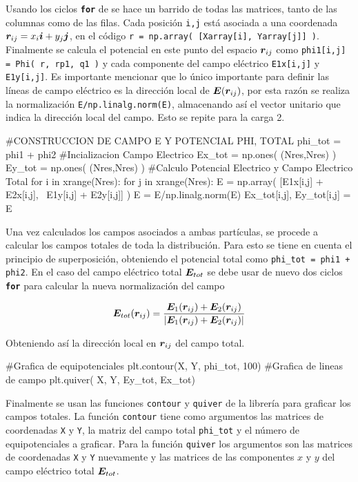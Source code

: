 Usando los ciclos \textbf{\texttt{for}} de \python se hace un barrido de 
todas las matrices, tanto de las columnas como de las filas. Cada posición 
\texttt{i,j} está asociada a una coordenada $\boldsymbol{ r }_{ij} = x_i\boldsymbol{ i } + 
y_j\boldsymbol{ j }$, en el código \texttt{r = np.array( [Xarray[i], Yarray[j]] )}.
Finalmente se calcula el potencial en este punto del espacio $\boldsymbol{ r }_{ij}$
como \texttt{phi1[i,j] = Phi( r, rp1, q1 )} y cada componente del campo 
eléctrico \texttt{E1x[i,j]} y \texttt{E1y[i,j]}. Es importante mencionar
que lo único importante para definir las líneas de campo eléctrico es la
dirección local de $\boldsymbol{ E }(\boldsymbol{ r }_{ij})$, por esta razón se realiza la
normalización \texttt{E/np.linalg.norm(E)}, almacenando así el vector 
unitario que indica la dirección local del campo. Esto se repite para la
carga 2.


\begin{listing}[style=python, numbers = none]
#CONSTRUCCION DE CAMPO E Y POTENCIAL PHI, TOTAL
phi_tot = phi1 + phi2
#Incializacion Campo Electrico
Ex_tot = np.ones( (Nres,Nres) )
Ey_tot = np.ones( (Nres,Nres) )
#Calculo Potencial Electrico y Campo Electrico Total
for i in xrange(Nres):
    for j in xrange(Nres):
	E = np.array( [E1x[i,j] + E2x[i,j], \
	E1y[i,j] + E2y[i,j]] )
	E = E/np.linalg.norm(E)
	Ex_tot[i,j], Ey_tot[i,j] = E 
\end{listing}
Una vez calculados los campos asociados a ambas partículas, se procede a 
calcular los campos totales de toda la distribución. Para esto se tiene
en cuenta el principio de superposición, obteniendo el potencial total como
\texttt{phi\_tot = phi1 + phi2}. En el caso del campo eléctrico total 
$\boldsymbol{ E }_{tot}$ se debe usar de nuevo dos ciclos \textbf{\texttt{for}} para
calcular la nueva normalización del campo 

\[ \boldsymbol{ E }_{tot}(\boldsymbol{ r }_{ij}) = \frac{\boldsymbol{ E }_1(\boldsymbol{ r }_{ij}) + \boldsymbol{ E }_2(\boldsymbol{ r }_{ij})}
{|\boldsymbol{ E }_1(\boldsymbol{ r }_{ij})+\boldsymbol{ E }_2(\boldsymbol{ r }_{ij})|} \]

Obteniendo así la dirección local en $\boldsymbol{ r }_{ij}$ del campo total.


\begin{listing}[style=python, numbers = none]
#Grafica de equipotenciales
plt.contour(X, Y, phi_tot, 100)
#Grafica de lineas de campo
plt.quiver( X, Y, Ey_tot, Ex_tot)
\end{listing}
Finalmente se usan las funciones \texttt{contour} y \texttt{quiver} de la
librería \matplotlib para graficar los campos totales. La función 
\texttt{contour} tiene como argumentos las matrices de coordenadas \texttt{X} 
y \texttt{Y}, la matriz del campo total \texttt{phi\_tot} y el número de 
equipotenciales a graficar. Para la función \texttt{quiver} los argumentos
son las matrices de coordenadas \texttt{X} y \texttt{Y} nuevamente y las 
matrices de las componentes $x$ y $y$ del campo eléctrico total $\boldsymbol{ E }_{tot}$.


